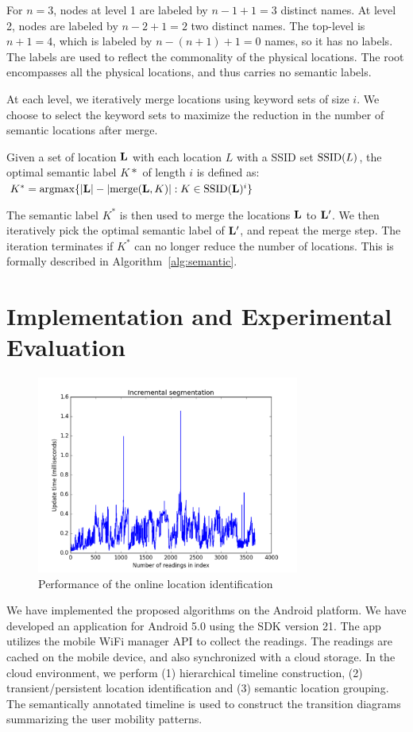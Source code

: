 For $n=3$, nodes at level 1 are labeled by $n-1+1=3$ distinct names.  At level
2, nodes are labeled by $n-2+1=2$ two distinct names.  The top-level is $n+1=4$,
which is labeled by $n-(n+1)+1 = 0$ names, so it has no labels.
The labels are used to reflect the commonality of the physical locations.
The root encompasses all the physical locations, and thus carries no semantic
labels.

At each level,  we iteratively merge locations using keyword sets of size
$i$.  We choose to select the keyword sets 
to maximize the reduction in the number of semantic locations after
merge.

Given a set of location $\mathbf{L}$ with each location $L$ with a SSID set $\mathrm{SSID}(L)$,
the optimal semantic label $K*$ of length $i$ is defined as:
$ K^* = \mathrm{argmax} \{|\mathbf{L}| - |\mathrm{merge}(\mathbf{L}, K)| : K\in\mathrm{SSID}(\mathbf{L})^i\}$

The semantic label $K^*$ is then used to merge the locations $\mathbf{L}$ to $\mathbf{L}'$.  We then
iteratively pick the optimal semantic label of $\mathbf{L}'$, and repeat the merge
step.  The iteration terminates if $K^*$ can no longer reduce the number of locations.
This is formally described in Algorithm~\ref{alg:semantic}.

\section{Implementation and Experimental Evaluation}

\begin{figure}[t]
    \centering
    \includegraphics[width=3.4in]{../plots/incremental.pdf}
    \caption{Performance of the online location identification}
    \label{fig:incremental}
\end{figure}

We have implemented the proposed algorithms on the Android platform.  We have
developed an application for Android 5.0 using the SDK version 21.  The app
utilizes the mobile WiFi manager API to collect the readings.  The readings are
cached on the mobile device, and also synchronized with a cloud storage.
In the cloud environment, we perform (1)
hierarchical timeline construction, (2) transient/persistent location
identification and (3) semantic location grouping.  The semantically annotated
timeline is used to construct the transition diagrams summarizing the user
mobility patterns.

